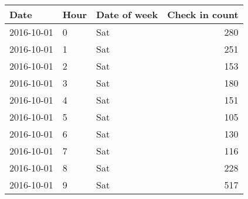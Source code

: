 \begin{tabular}{lllr}
 Date & Hour & Date of week & Check in count \\ 
  \hline
\hline
2016-10-01 & 0 & Sat & 280 \\ 
   \hline
2016-10-01 & 1 & Sat & 251 \\ 
   \hline
2016-10-01 & 2 & Sat & 153 \\ 
   \hline
2016-10-01 & 3 & Sat & 180 \\ 
   \hline
2016-10-01 & 4 & Sat & 151 \\ 
   \hline
2016-10-01 & 5 & Sat & 105 \\ 
   \hline
2016-10-01 & 6 & Sat & 130 \\ 
   \hline
2016-10-01 & 7 & Sat & 116 \\ 
   \hline
2016-10-01 & 8 & Sat & 228 \\ 
   \hline
2016-10-01 & 9 & Sat & 517 \\ 
  \end{tabular}
